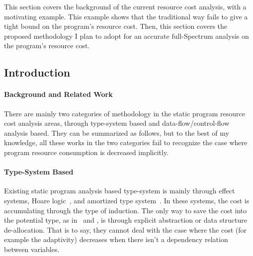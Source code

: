 This section covers the background of the current resource cost analysis,
with a 
motivating example.
This example shows that the traditional way fails to give a tight bound on the program's resource cost.
Then, this section covers the proposed methodology I plan to adopt for an accurate full-Spectrum
analysis on 
the program's resource cost.
\subsection{Introduction}
\label{subsubsec:furthers-cost-backgroung}
\paragraph*{Background and Related Work}There are mainly two categories of methodology in the static program resource cost analysis areas, 
through type-system based and data-flow/control-flow analysis based. 
They can be summarized as follows, but to the best of my knowledge,
all these works in the two categories fail to recognize the case where program resource consumption is decreased implicitly.
 \paragraph*{Type-System Based}
Existing
static program analysis based type-system is mainly through 
effect systems, 
Hoare logic~\cite{gaboardi2021graded}, and amortized type system~\cite{hoffmann_jost_2022}.
%
In these systems, the cost is accumulating through the type of induction. 
The only way to save the cost into the potential
type, as in~\cite{GustafssonEL05} and \cite{hoffmann_jost_2022}, 
is through explicit abstraction or data structure de-allocation.
That is to say, they cannot deal with the case where the cost (for example the adaptivity) decreases when there isn't a dependency relation between variables.
